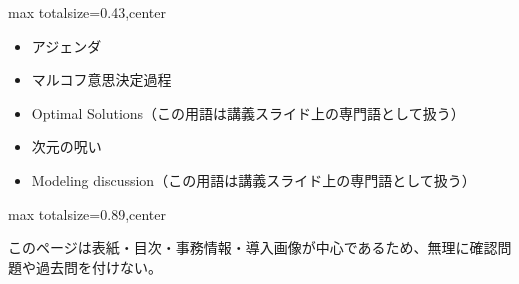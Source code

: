 \clearpage
{}
\begin{minipage}[t]{0.405\textwidth}
\begin{adjustbox}{max totalsize={\textwidth}{0.43\textheight},center}
\begin{minipage}{\textwidth}\scriptsize
{}\begin{itemize}
\item アジェンダ
\item マルコフ意思決定過程
\item Optimal Solutions（この用語は講義スライド上の専門語として扱う）
\item 次元の呪い
\item Modeling discussion（この用語は講義スライド上の専門語として扱う）
\end{itemize}
\end{minipage}
\end{adjustbox}
\end{minipage}\hfill
\begin{minipage}[t]{0.58\textwidth}
\begin{adjustbox}{max totalsize={\textwidth}{0.89\textheight},center}
\begin{minipage}{\textwidth}\scriptsize
{}このページは表紙・目次・事務情報・導入画像が中心であるため、無理に確認問題や過去問を付けない。
\end{minipage}
\end{adjustbox}
\end{minipage}


